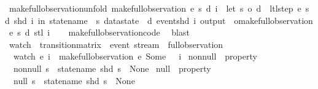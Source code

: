 \begin{isabellebody}
\isanewline
{}\isamarkupfalse%
\ make{\isacharunderscore}full{\isacharunderscore}observation{\isacharunderscore}unfold{\isacharcolon}\ {\isachardoublequoteopen}make{\isacharunderscore}full{\isacharunderscore}observation\ e\ s\ d\ i\ {\isacharequal}\ {\isacharparenleft}let\ {\isacharparenleft}s{\isacharprime}{\isacharcomma}\ o{\isacharprime}{\isacharcomma}\ d{\isacharprime}{\isacharparenright}\ {\isacharequal}\ ltl{\isacharunderscore}step\ e\ s\ d\ {\isacharparenleft}shd\ i{\isacharparenright}\ in\ {\isasymlparr}statename\ {\isacharequal}\ s{\isacharcomma}\ datastate\ {\isacharequal}\ d{\isacharcomma}\ event{\isacharequal}{\isacharparenleft}shd\ i{\isacharparenright}{\isacharcomma}\ output\ {\isacharequal}\ o{\isacharprime}{\isasymrparr}{\isacharhash}{\isacharhash}{\isacharparenleft}make{\isacharunderscore}full{\isacharunderscore}observation\ e\ s{\isacharprime}\ d{\isacharprime}\ {\isacharparenleft}stl\ i{\isacharparenright}{\isacharparenright}{\isacharparenright}{\isachardoublequoteclose}\isanewline
%
\isadelimproof
\ \ %
\endisadelimproof
%
\isatagproof
{}\isamarkupfalse%
\ make{\isacharunderscore}full{\isacharunderscore}observation{\isachardot}code\ \isamarkupfalse%
\ blast%
\endisatagproof
{\isafoldproof}%
%
\isadelimproof
\isanewline
%
\endisadelimproof
\isanewline
{}\isamarkupfalse%
\ watch\ {\isacharcolon}{\isacharcolon}\ {\isachardoublequoteopen}transition{\isacharunderscore}matrix\ {\isasymRightarrow}\ event\ stream\ {\isasymRightarrow}\ full{\isacharunderscore}observation{\isachardoublequoteclose}\ \isanewline
\ \ {\isachardoublequoteopen}watch\ e\ i\ {\isasymequiv}\ {\isacharparenleft}make{\isacharunderscore}full{\isacharunderscore}observation\ e\ {\isacharparenleft}Some\ {}{\isacharparenright}\ {\isacharless}{\isachargreater}\ i{\isacharparenright}{\isachardoublequoteclose}\isanewline
\isanewline
{}\isamarkupfalse%
\ non{\isacharunderscore}null\ {\isacharcolon}{\isacharcolon}\ {\isachardoublequoteopen}property{\isachardoublequoteclose}\ \isanewline
\ \ {\isachardoublequoteopen}non{\isacharunderscore}null\ s\ {\isasymequiv}\ {\isacharparenleft}statename\ {\isacharparenleft}shd\ s{\isacharparenright}\ {\isasymnoteq}\ None{\isacharparenright}{\isachardoublequoteclose}\isanewline
\isanewline
{}\isamarkupfalse%
\ null\ {\isacharcolon}{\isacharcolon}\ {\isachardoublequoteopen}property{\isachardoublequoteclose}\ \isanewline
\ \ {\isachardoublequoteopen}null\ s\ {\isasymequiv}\ {\isacharparenleft}statename\ {\isacharparenleft}shd\ s{\isacharparenright}\ {\isacharequal}\ None{\isacharparenright}{\isachardoublequoteclose}\isanewline

\end{isabellebody}
